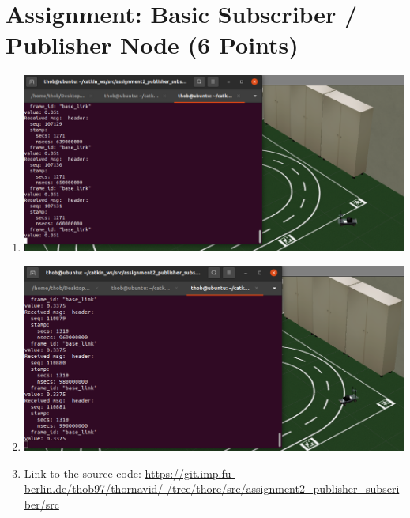 \section{Assignment: Basic Subscriber / Publisher Node (6 Points)}
\begin{enumerate}[]
    \item \includegraphics[width=1\textwidth]{src/u2/asg2_2.png}
    \item \includegraphics[width=1\textwidth]{src/u2/asg2_3.png}
    \item Link to the source code: \url{https://git.imp.fu-berlin.de/thob97/thornavid/-/tree/thore/src/assignment2_publisher_subscriber/src}
\end{enumerate}  

